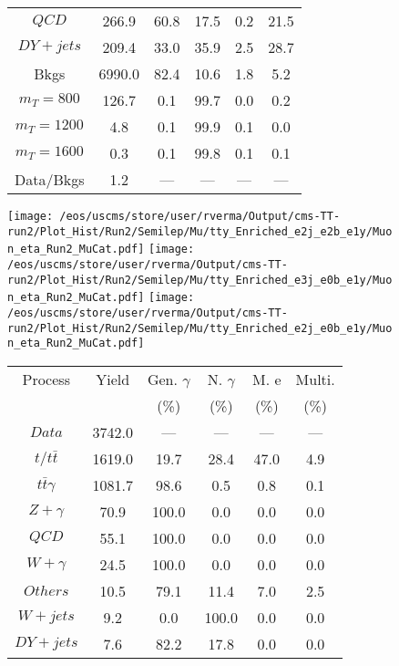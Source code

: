 \begin{figure}
\begin{minipage}[c]{0.32\textwidth}
{\begin{tabular}{cccccc}
$ QCD $ &  266.9 &  60.8 &  17.5 &  0.2 &  21.5\\
$ DY+jets $ &  209.4 &  33.0 &  35.9 &  2.5 &  28.7\\
Bkgs &  6990.0 &  82.4 &  10.6 &  1.8 &  5.2\\
$ m_{T} = 800 $ &  126.7 &  0.1 &  99.7 &  0.0 &  0.2\\
$ m_{T} = 1200 $ &  4.8 &  0.1 &  99.9 &  0.1 &  0.0\\
$ m_{T} = 1600 $ &  0.3 &  0.1 &  99.8 &  0.1 &  0.1\\
Data/Bkgs &  1.2 &  --- &  --- &  --- &  ---\\
\hline
\end{tabular}
}
\end{minipage}
\end{figure}

\begin{figure}
\centering
\texttt{[image: /eos/uscms/store/user/rverma/Output/cms-TT-run2/Plot\_Hist/Run2/Semilep/Mu/tty\_Enriched\_e2j\_e2b\_e1y/Muon\_eta\_Run2\_MuCat.pdf]}
\texttt{[image: /eos/uscms/store/user/rverma/Output/cms-TT-run2/Plot\_Hist/Run2/Semilep/Mu/tty\_Enriched\_e3j\_e0b\_e1y/Muon\_eta\_Run2\_MuCat.pdf]}
\texttt{[image: /eos/uscms/store/user/rverma/Output/cms-TT-run2/Plot\_Hist/Run2/Semilep/Mu/tty\_Enriched\_e2j\_e0b\_e1y/Muon\_eta\_Run2\_MuCat.pdf]}
\begin{minipage}[c]{0.32\textwidth}
\centering
\tiny{
\begin{tabular}{cccccc}
\hline
Process & Yield & Gen. $\gamma$ & N. $\gamma$ & M. e & Multi. \\
 &  & (\%) & (\%) & (\%) & (\%)  \\
\hline
                                                                      $ Data $ &  3742.0 &  --- &  --- &  --- &  ---\\
$ t/t\bar{t} $ &  1619.0 &  19.7 &  28.4 &  47.0 &  4.9\\
$ t\bar{t}\gamma $ &  1081.7 &  98.6 &  0.5 &  0.8 &  0.1\\
$ Z+\gamma $ &  70.9 &  100.0 &  0.0 &  0.0 &  0.0\\
$ QCD $ &  55.1 &  100.0 &  0.0 &  0.0 &  0.0\\
$ W+\gamma $ &  24.5 &  100.0 &  0.0 &  0.0 &  0.0\\
$ Others $ &  10.5 &  79.1 &  11.4 &  7.0 &  2.5\\
$ W+jets $ &  9.2 &  0.0 &  100.0 &  0.0 &  0.0\\
$ DY+jets $ &  7.6 &  82.2 &  17.8 &  0.0 &  0.0\\

\end{tabular}}
\end{minipage}
\end{figure}
